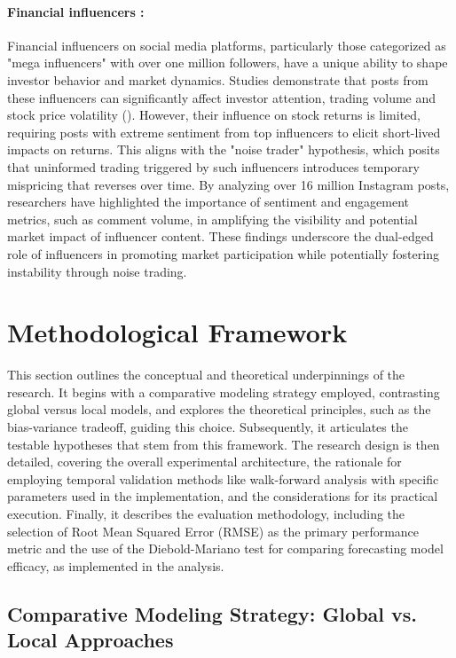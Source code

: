 \documentclass[12pt]{report}
\begin{document}
\paragraph{Financial influencers :}Financial influencers on social media platforms, particularly those categorized as "mega influencers" with over one million followers, have a unique ability to shape investor behavior and market dynamics. Studies demonstrate that posts from these influencers can significantly affect investor attention, trading volume and stock price volatility (\cite{keasey_impact_2024}). However, their influence on stock returns is limited, requiring posts with extreme sentiment from top influencers to elicit short-lived impacts on returns. This aligns with the "noise trader" hypothesis, which posits that uninformed trading triggered by such influencers introduces temporary mispricing that reverses over time. By analyzing over 16 million Instagram posts, researchers have highlighted the importance of sentiment and engagement metrics, such as comment volume, in amplifying the visibility and potential market impact of influencer content. These findings underscore the dual-edged role of influencers in promoting market participation while potentially fostering instability through noise trading.


\newpage
\section{Methodological Framework}
This section outlines the conceptual and theoretical underpinnings of the research. It begins with a comparative modeling strategy employed, contrasting global versus local models, and explores the theoretical principles, such as the bias-variance tradeoff, guiding this choice. Subsequently, it articulates the testable hypotheses that stem from this framework. The research design is then detailed, covering the overall experimental architecture, the rationale for employing temporal validation methods like walk-forward analysis with specific parameters used in the implementation, and the considerations for its practical execution. Finally, it describes the evaluation methodology, including the selection of Root Mean Squared Error (RMSE) as the primary performance metric and the use of the Diebold-Mariano test for comparing forecasting model efficacy, as implemented in the
analysis.

\subsection{Comparative Modeling Strategy: Global vs. Local Approaches}
\end{document}
